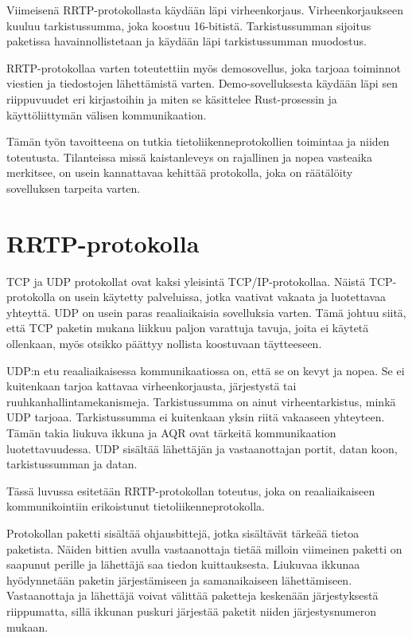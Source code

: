 \documentclass[a4paper,12pt]{article}
\begin{document}
    Viimeisenä RRTP-protokollasta käydään läpi virheenkorjaus. Virheenkorjaukseen kuuluu tarkistussumma, joka koostuu 16-bitistä. Tarkistussumman sijoitus paketissa havainnollistetaan ja käydään läpi
    tarkistussumman muodostus.\par

    RRTP-protokollaa varten toteutettiin myös demosovellus, joka tarjoaa 
    toiminnot viestien ja tiedostojen lähettämistä varten. Demo-sovelluksesta käydään 
    läpi sen riippuvuudet eri kirjastoihin ja miten se käsittelee Rust-prosessin ja 
    käyttöliittymän välisen kommunikaation. \par

    Tämän työn tavoitteena on tutkia tietoliikenneprotokollien toimintaa ja niiden toteutusta. Tilanteissa missä kaistanleveys on rajallinen ja nopea vasteaika merkitsee, on usein kannattavaa kehittää protokolla, joka on räätälöity sovelluksen tarpeita varten.

   \section{RRTP-protokolla}\label{sec:protocol}
    TCP ja UDP protokollat ovat kaksi yleisintä TCP/IP-protokollaa.
    Näistä TCP-protokolla on usein käytetty palveluissa, jotka vaativat vakaata ja luotettavaa yhteyttä. UDP on usein paras reaaliaikaisia sovelluksia varten. Tämä johtuu siitä, että TCP paketin mukana liikkuu paljon varattuja tavuja, joita ei käytetä ollenkaan, myös otsikko päättyy nollista koostuvaan täytteeseen.\par
    
    UDP:n etu reaaliaikaisessa kommunikaatiossa on, että se on kevyt ja nopea. Se ei kuitenkaan tarjoa kattavaa virheenkorjausta, järjestystä tai ruuhkanhallintamekanismeja. Tarkistussumma on ainut virheentarkistus, minkä UDP tarjoaa. Tarkistussumma ei kuitenkaan yksin riitä vakaaseen yhteyteen. Tämän takia liukuva ikkuna ja AQR ovat tärkeitä kommunikaation luotettavuudessa. UDP sisältää
    lähettäjän ja vastaanottajan portit, datan koon, tarkistussumman ja datan.
    \cite{KumarSurveyUDP}
    \par
   
    Tässä luvussa esitetään RRTP-protokollan toteutus, joka on reaaliaikaiseen kommunikointiin erikoistunut tietoliikenneprotokolla.\par

    Protokollan paketti sisältää ohjausbittejä, jotka sisältävät tärkeää tietoa paketista. Näiden bittien avulla vastaanottaja tietää milloin viimeinen paketti on saapunut perille ja lähettäjä saa tiedon kuittauksesta. 
    Liukuvaa ikkunaa hyödynnetään paketin järjestämiseen ja samanaikaiseen lähettämiseen.
    Vastaanottaja ja lähettäjä voivat välittää paketteja keskenään järjestyksestä riippumatta, sillä ikkunan puskuri järjestää paketit niiden järjestysnumeron mukaan.
\end{document}
